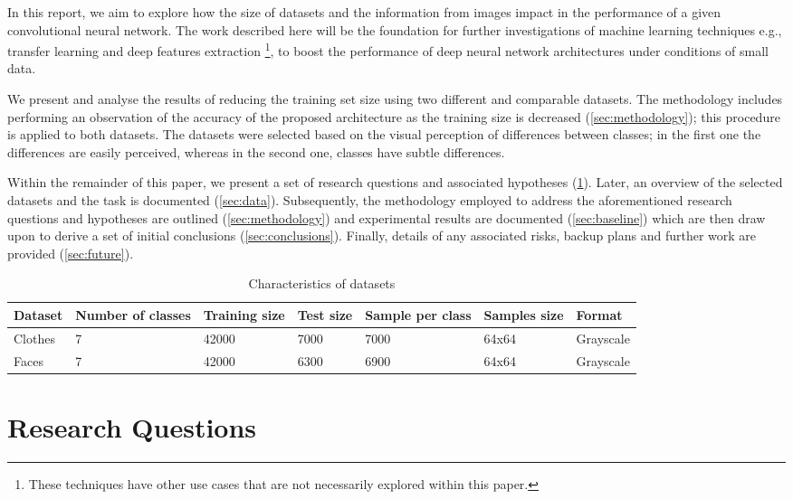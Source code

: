 \documentclass{article}
\begin{document}
In this report, we aim to explore how the size of datasets and the information from images impact in the performance of a given convolutional neural network. The work described here will be the foundation for further investigations of machine learning techniques e.g., transfer learning and deep features extraction \footnote{These techniques have other use cases that are not necessarily explored within this paper.}, to boost the performance of deep neural network architectures under conditions of small data.

We present and analyse the results of reducing the training set size using two different and comparable datasets. The methodology includes performing an observation of the accuracy of the proposed architecture as the training size is decreased (\ref{sec:methodology}); this procedure is applied to both datasets. The datasets were selected based on the visual perception of differences between classes; in the first one the differences are easily perceived, whereas in the second one, classes have subtle differences.

Within the remainder of this paper, we present a set of research questions and associated hypotheses (\ref{sec:questions}). Later, an overview of the selected datasets and the task is documented (\ref{sec:data}). Subsequently, the methodology employed to address the aforementioned research questions and hypotheses are outlined (\ref{sec:methodology}) and experimental results are documented (\ref{sec:baseline}) which are then draw upon to derive a set of initial conclusions (\ref{sec:conclusions}). Finally, details of any associated risks, backup plans and further work are provided (\ref{sec:future}).

 
\begin{table*}[!htb]
  \centering
  \begin{tabular}{| l | l | l | l | l | l | l |}
    \hline
    \textbf{Dataset} & \textbf{Number of classes} & \textbf{Training size} & \textbf{Test size}  &  \textbf{Sample per class} & \textbf{Samples size} & \textbf{Format} \\ \hline
    Clothes & 7 & 42000 & 7000 & 7000 & 64x64 & Grayscale\\ \hline
    Faces & 7 & 42000 & 6300 & 6900 & 64x64 & Grayscale\\ \hline
  \end{tabular}
  \caption{Characteristics of datasets}
  \label{tab:1}
\end{table*}

\section{Research Questions}
\label{sec:questions}
\end{document}
